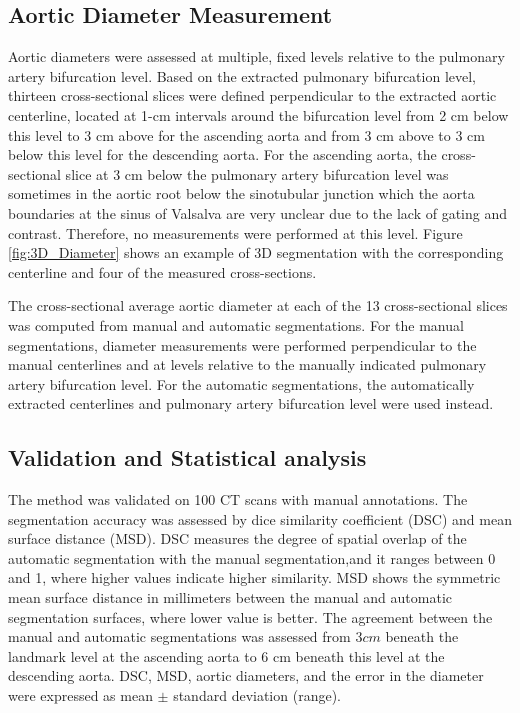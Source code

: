 \subsection{Aortic Diameter Measurement}
Aortic diameters were assessed at multiple, fixed levels relative to the pulmonary artery bifurcation level. Based on the extracted pulmonary bifurcation level, thirteen cross-sectional slices were defined perpendicular to the extracted aortic centerline, located at 1-cm intervals around the bifurcation level from 2 cm below this level to 3 cm above for the ascending aorta and from 3 cm above to 3 cm below this level for the descending aorta. For the ascending aorta, the cross-sectional slice at 3 cm below the pulmonary artery bifurcation level was sometimes in the aortic root below the sinotubular junction which the aorta boundaries at the sinus of Valsalva are very unclear due to the lack of gating and contrast. Therefore, no measurements were performed at this level. Figure \cref{fig:3D_Diameter} shows an example of 3D segmentation with the corresponding centerline and four of the measured cross-sections.


The cross-sectional average aortic diameter at each of the 13 cross-sectional slices was computed from manual and automatic segmentations. For the manual segmentations, diameter measurements were performed perpendicular to the manual centerlines and at levels relative to the manually indicated pulmonary artery bifurcation level. For the automatic segmentations, the automatically extracted centerlines and pulmonary artery bifurcation level were used instead.


\subsection{Validation and Statistical analysis}
The method was validated on 100 CT scans with manual annotations. The segmentation accuracy was assessed by dice
similarity coefficient (DSC) and mean surface distance (MSD). DSC \autocite{dice1945measures} measures the degree of spatial overlap of the automatic segmentation with the manual segmentation,and it ranges between 0 and 1, where higher values indicate higher similarity. MSD shows the symmetric mean surface distance in millimeters between the manual and automatic segmentation surfaces, where lower value is better. The agreement between the manual and automatic segmentations was assessed from $3 cm$ beneath the landmark level at the ascending aorta to 6 cm beneath this level at the descending aorta. DSC, MSD, aortic diameters, and the error in the diameter
were expressed as mean $\pm$ standard deviation (range).


